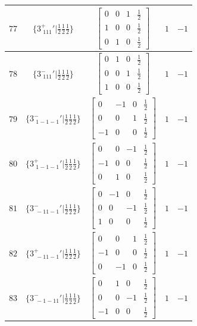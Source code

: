 \documentclass[fleqn,8pt]{jsarticle}
\begin{document}
\begin{longtable}{ccccc}
$ 77 $ & $ \{3^{+}_{\,\,111}{}'|\frac{1}{2} \frac{1}{2} \frac{1}{2}\} $ & $ \begin{bmatrix} 0 & 0 & 1 & \frac{1}{2} \\ 1 & 0 & 0 & \frac{1}{2} \\ 0 & 1 & 0 & \frac{1}{2} \end{bmatrix} $ & $ 1 $ & $ -1 $ \\ \hline
$ 78 $ & $ \{3^{-}_{\,\,111}{}'|\frac{1}{2} \frac{1}{2} \frac{1}{2}\} $ & $ \begin{bmatrix} 0 & 1 & 0 & \frac{1}{2} \\ 0 & 0 & 1 & \frac{1}{2} \\ 1 & 0 & 0 & \frac{1}{2} \end{bmatrix} $ & $ 1 $ & $ -1 $ \\ \hline
$ 79 $ & $ \{3^{-}_{\,\,1-1-1}{}'|\frac{1}{2} \frac{1}{2} \frac{1}{2}\} $ & $ \begin{bmatrix} 0 & -1 & 0 & \frac{1}{2} \\ 0 & 0 & 1 & \frac{1}{2} \\ -1 & 0 & 0 & \frac{1}{2} \end{bmatrix} $ & $ 1 $ & $ -1 $ \\ \hline
$ 80 $ & $ \{3^{+}_{\,\,1-1-1}{}'|\frac{1}{2} \frac{1}{2} \frac{1}{2}\} $ & $ \begin{bmatrix} 0 & 0 & -1 & \frac{1}{2} \\ -1 & 0 & 0 & \frac{1}{2} \\ 0 & 1 & 0 & \frac{1}{2} \end{bmatrix} $ & $ 1 $ & $ -1 $ \\ \hline
$ 81 $ & $ \{3^{-}_{\,\,-11-1}{}'|\frac{1}{2} \frac{1}{2} \frac{1}{2}\} $ & $ \begin{bmatrix} 0 & -1 & 0 & \frac{1}{2} \\ 0 & 0 & -1 & \frac{1}{2} \\ 1 & 0 & 0 & \frac{1}{2} \end{bmatrix} $ & $ 1 $ & $ -1 $ \\ \hline
$ 82 $ & $ \{3^{+}_{\,\,-11-1}{}'|\frac{1}{2} \frac{1}{2} \frac{1}{2}\} $ & $ \begin{bmatrix} 0 & 0 & 1 & \frac{1}{2} \\ -1 & 0 & 0 & \frac{1}{2} \\ 0 & -1 & 0 & \frac{1}{2} \end{bmatrix} $ & $ 1 $ & $ -1 $ \\ \hline
$ 83 $ & $ \{3^{-}_{\,\,-1-11}{}'|\frac{1}{2} \frac{1}{2} \frac{1}{2}\} $ & $ \begin{bmatrix} 0 & 1 & 0 & \frac{1}{2} \\ 0 & 0 & -1 & \frac{1}{2} \\ -1 & 0 & 0 & \frac{1}{2} \end{bmatrix} $ & $ 1 $ & $ -1 $ \\ \hline

\end{longtable}
\end{document}
